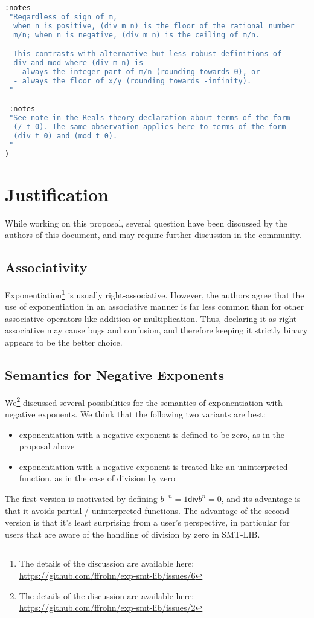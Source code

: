 \documentclass{article}
\begin{document}
\begin{lstlisting}[language=Lisp]
 :notes
 "Regardless of sign of m,
  when n is positive, (div m n) is the floor of the rational number
  m/n; when n is negative, (div m n) is the ceiling of m/n.

  This contrasts with alternative but less robust definitions of
  div and mod where (div m n) is
  - always the integer part of m/n (rounding towards 0), or
  - always the floor of x/y (rounding towards -infinity).
 "

 :notes
 "See note in the Reals theory declaration about terms of the form
  (/ t 0). The same observation applies here to terms of the form
  (div t 0) and (mod t 0).
 "
)

\end{lstlisting}

\section{Justification}

While working on this proposal, several question have been discussed by the authors of this document, and may require further discussion in the community.

\subsection{Associativity}

Exponentiation\footnote{The details of the discussion are available here: \url{https://github.com/ffrohn/exp-smt-lib/issues/6}} is usually right-associative.
%
However, the authors agree that the use of exponentiation in an associative manner is far less common than for other associative operators like addition or multiplication.
%
Thus, declaring it as right-associative may cause bugs and confusion, and therefore keeping it strictly binary appears to be the better choice.

\subsection{Semantics for Negative Exponents}

We\footnote{The details of the discussion are available here: \url{https://github.com/ffrohn/exp-smt-lib/issues/2}} discussed several possibilities for the semantics of exponentiation with negative exponents.
%
We think that the following two variants are best:
%
\begin{itemize}
\item exponentiation with a negative exponent is defined to be zero, as in the proposal above
\item exponentiation with a negative exponent is treated like an uninterpreted function, as in the case of division by zero
\end{itemize}
%
The first version is motivated by defining $b^{-n} = 1 \mathrel{\mathsf{div}} b^n = 0$, and its advantage is that it avoids partial / uninterpreted functions.
%
The advantage of the second version is that it's least surprising from a user's perspective, in particular for users that are aware of the handling of division by zero in SMT-LIB.
\end{document}
